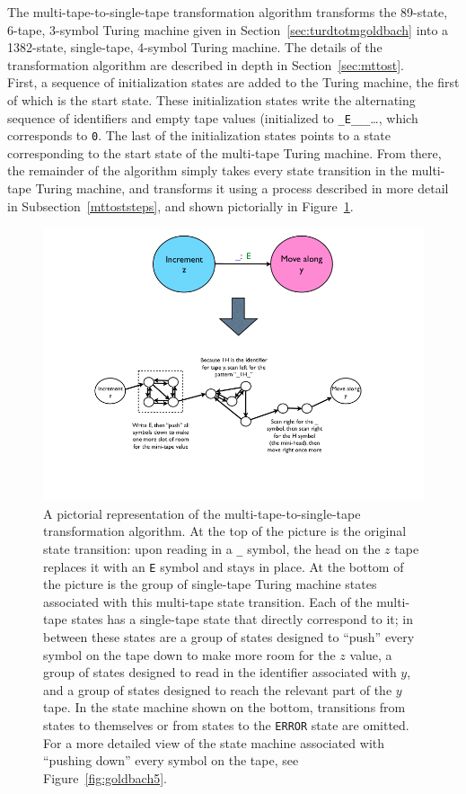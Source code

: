 \documentclass[11pt]{report}
\begin{document}
The multi-tape-to-single-tape transformation algorithm transforms the 89-state, 6-tape, 3-symbol Turing machine given in Section~\ref{sec:turdtotmgoldbach} into a 1382-state, single-tape, 4-symbol Turing machine. The details of the transformation algorithm are described in depth in Section~\ref{sec:mttost}. \\

First, a sequence of initialization states are added to the Turing machine, the first of which is the start state. These initialization states write the alternating sequence of identifiers and empty tape values (initialized to \texttt{\_E\_\_\_}\dots, which corresponds to \texttt{0}. The last of the initialization states points to a state corresponding to the start state of the multi-tape Turing machine. From there, the remainder of the algorithm simply takes every state transition in the multi-tape Turing machine, and transforms it using a process described in more detail in Subsection~\ref{mttoststeps}, and shown pictorially in Figure~\ref{fig:goldbach4}.

\begin{figure} 
\begin{center} 
\includegraphics[scale=0.4]{figs/goldbach4.png} 
\caption{A pictorial representation of the multi-tape-to-single-tape transformation algorithm. At the top of the picture is the original state transition: upon reading in a \texttt{\_} symbol, the head on the $z$ tape replaces it with an \texttt{E} symbol and stays in place. At the bottom of the picture is the group of single-tape Turing machine states associated with this multi-tape state transition. Each of the multi-tape states has a single-tape state that directly correspond to it; in between these states are a group of states designed to ``push'' every symbol on the tape down to make more room for the $z$ value, a group of states designed to read in the identifier associated with $y$, and a group of states designed to reach the relevant part of the $y$ tape. In the state machine shown on the bottom, transitions from states to themselves or from states to the \texttt{ERROR} state are omitted. For a more detailed view of the state machine associated with ``pushing down'' every symbol on the tape, see Figure~\ref{fig:goldbach5}. \label{fig:goldbach4}}
\end{center} 
\end{figure}
\end{document}
